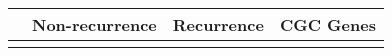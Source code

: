 \begin{tabular}{lccr}
\toprule
{} & Non-recurrence & Recurrence & CGC Genes \\
\midrule
{} &                &            &           \\
\bottomrule
\end{tabular}
